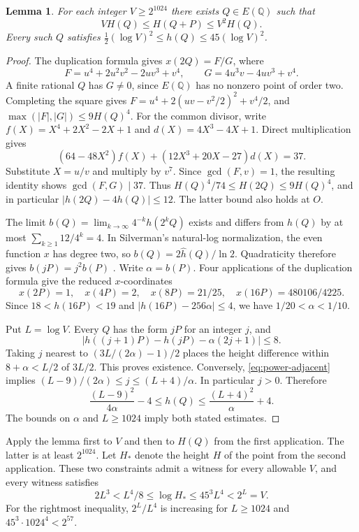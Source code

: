 \documentclass[11pt,letterpaper]{article}
\newtheorem{lemma}[theorem]{Lemma}
\numberwithin{equation}{section}
\begin{document}
\begin{lemma}\label{lem:power-height}
For each integer $V\ge2^{1024}$ there exists $Q\in E(\mathbb Q)$ such that
\begin{equation}\label{eq:power-adjacent}
          V H(Q)\le H(Q+P)\le V^2 H(Q).
\end{equation}
Every such $Q$ satisfies
$\tfrac12(\log V)^2\le h(Q)\le45(\log V)^2$.
\end{lemma}
\begin{proof}
The duplication formula gives $x(2Q)=F/G$, where
\[
 F=u^4+2u^2v^2-2uv^3+v^4,\qquad
 G=4u^3v-4uv^3+v^4.
\]
A finite rational $Q$ has $G\ne0$, since $E(\mathbb Q)$ has no
nonzero point of order two. Completing the square gives
$F=u^4+2(uv-v^2/2)^2+v^4/2$, and
$\max(|F|,|G|)\le9H(Q)^4$. For the common divisor, write
$f(X)=X^4+2X^2-2X+1$ and $d(X)=4X^3-4X+1$. Direct multiplication gives
\[
 (64-48X^2)f(X)+(12X^3+20X-27)d(X)=37.
\]
Substitute $X=u/v$ and multiply by $v^7$. Since $\gcd(F,v)=1$,
the resulting identity shows $\gcd(F,G)\mid37$. Thus
$H(Q)^4/74\le H(2Q)\le9H(Q)^4$, and in particular
$|h(2Q)-4h(Q)|\le12$. The latter bound also holds at $O$.

The limit $b(Q)=\lim_{k\to\infty}4^{-k}h(2^kQ)$ exists and differs
from $h(Q)$ by at most $\sum_{k\ge1}12/4^k=4$. In Silverman's natural-log normalization, the even function $x$ has degree two, so $b(Q)=2\widehat h(Q)/\ln 2$. Quadraticity therefore gives $b(jP)=j^2 b(P)$ \cite[Chap.~VIII, Section~9, Thm.~9.3(b)]{silverman}.
Write $\alpha=b(P)$. Four applications of the duplication formula
give the reduced $x$-coordinates
\[
 x(2P)=1,\quad x(4P)=2,\quad x(8P)=21/25,\quad
 x(16P)=480106/4225.
\]
Since $18<h(16P)<19$ and $|h(16P)-256\alpha|\le4$, we have
$1/20<\alpha<1/10$.

Put $L=\log V$. Every $Q$ has the form $jP$ for an integer $j$, and
\[
 |h((j+1)P)-h(jP)-\alpha(2j+1)|\le8.
\]
Taking $j$ nearest to $(3L/(2\alpha)-1)/2$ places the height difference
within $8+\alpha<L/2$ of $3L/2$. This proves existence. Conversely,
\eqref{eq:power-adjacent} implies
$(L-9)/(2\alpha)\le j\le(L+4)/\alpha$. In particular $j>0$. Therefore
\[
 \frac{(L-9)^2}{4\alpha}-4\le h(Q)
             \le \frac{(L+4)^2}{\alpha}+4 .
\]
The bounds on $\alpha$ and $L\ge1024$ imply both stated estimates.
\end{proof}

Apply the lemma first to $V$ and then to $H(Q)$ from the first
application. The latter is at least $2^{1024}$. Let $H_*$ denote the
height $H$ of the point from the second application. These two
constraints admit a witness for every allowable $V$, and every
witness satisfies
\begin{equation}\label{eq:power-window}
  2L^3 < L^4/8\le \log H_*\le 45^3L^4 < 2^L=V.
\end{equation}
For the rightmost inequality, $2^L/L^4$ is increasing for $L\ge1024$
and $45^3\cdot1024^4<2^{57}$.
\end{document}
